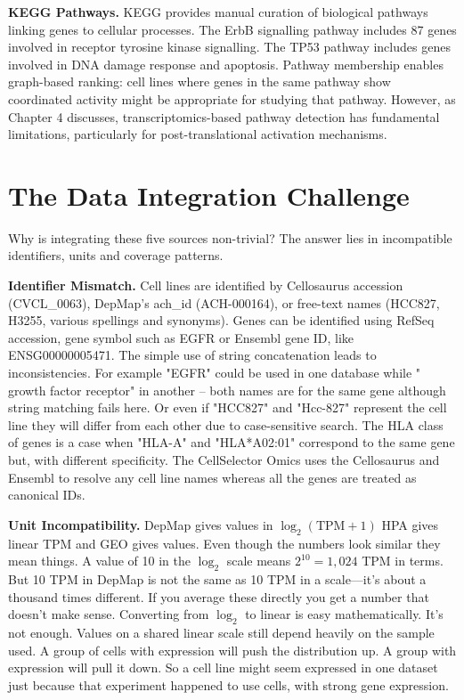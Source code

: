 \documentclass[author={Karen Coutinho, Ishaan Bhalla, Aman Raj, Dixit Kaloorani Malarmannan},
                supervisor={Dr. Daniel D'Andrea},
                degree={MSc},
                title={CellSelector Omics: A Multi-Omics Recommendation System for Cell Line Selection},
                subtitle={},
                type={},
                year={2026}]{dissertation}
\begin{document}
{\bf KEGG Pathways.} KEGG \cite{kegg2016} provides manual curation of biological pathways linking genes to cellular processes. The ErbB signalling pathway includes 87 genes involved in receptor tyrosine kinase signalling. The TP53 pathway includes genes involved in DNA damage response and apoptosis. Pathway membership enables graph-based ranking: cell lines where genes in the same pathway show coordinated activity might be appropriate for studying that pathway. However, as Chapter 4 discusses, transcriptomics-based pathway detection has fundamental limitations, particularly for post-translational activation mechanisms.

\section{The Data Integration Challenge}

Why is integrating these five sources non-trivial? The answer lies in incompatible identifiers, units and coverage patterns.

{\bf Identifier Mismatch.} Cell lines are identified by Cellosaurus accession (CVCL\_0063), DepMap's ach\_id (ACH-000164), or free-text names (HCC827, H3255, various spellings and synonyms). Genes can be identified using RefSeq accession, gene symbol such as EGFR or Ensembl gene ID, like ENSG00000005471. The simple use of string concatenation leads to inconsistencies. For example "EGFR" could be used in one database while " growth factor receptor" in another – both names are for the same gene although string matching fails here. Or even if "HCC827" and "Hcc-827" represent the cell line they will differ from each other due to case-sensitive search. The HLA class of genes is a case when "HLA-A" and "HLA*A02:01" correspond to the same gene but, with different specificity. The CellSelector Omics uses the Cellosaurus and Ensembl to resolve any cell line names whereas all the genes are treated as canonical IDs.

{\bf Unit Incompatibility.} DepMap gives values in $\log_2(\text{TPM}+1)$ HPA gives linear TPM and GEO gives values. Even though the numbers look similar they mean things. A value of 10 in the $\log_2$ scale means $2^{10} = 1{,}024$ TPM in terms. But 10 TPM in DepMap is not the same as 10 TPM in a scale—it's about a thousand times different. If you average these directly you get a number that doesn't make sense. Converting from $\log_2$ to linear is easy mathematically. It’s not enough. Values on a shared linear scale still depend heavily on the sample used. A group of cells with expression will push the distribution up. A group with expression will pull it down. So a cell line might seem expressed in one dataset just because that experiment happened to use cells, with strong gene expression.
\end{document}
